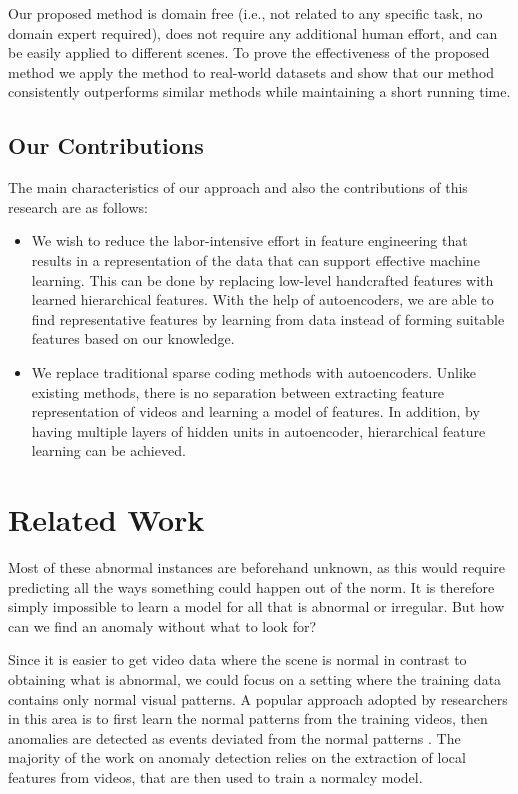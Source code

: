 \documentclass[a4paper]{article}
\begin{document}
Our proposed method is domain free (i.e., not related to any specific task, no domain expert required), does not require any additional human effort, and can be easily applied to different scenes. To prove the effectiveness of the proposed method we apply the method to real-world datasets and show that our method consistently outperforms similar methods while maintaining a short running time.

\subsection{Our Contributions}
The main characteristics of our approach and also the contributions of this research are as follows:
\begin{itemize}
	\item We wish to reduce the labor-intensive effort in feature engineering that results in a representation of the data that can support effective machine learning. This can be done by replacing low-level handcrafted features with learned hierarchical features. With the help of autoencoders, we are able to find representative features by learning from data instead of forming suitable features based on our knowledge.\\
	\item We replace traditional sparse coding methods with autoencoders. Unlike existing methods, there is no separation between extracting feature representation of videos and learning a model of features. In addition, by having multiple layers of hidden units in autoencoder, hierarchical feature learning can be achieved.
\end{itemize} 

\section{Related Work}

Most of these abnormal instances are beforehand unknown, as this would require predicting all the ways something could happen out of the norm. It is therefore simply impossible to learn a model for all that is abnormal or irregular. But how can we find an anomaly without what to look for? 

Since it is easier to get video data where the scene is normal in contrast to obtaining what is abnormal, we could focus on a setting where the training data contains only normal visual patterns. A popular approach adopted by researchers in this area is to first learn the normal patterns from the training videos, then anomalies are detected as events deviated from the normal patterns \cite{lu2013,cong2011,zhao2011,li2011}. The majority of the work on anomaly detection relies on the extraction of local features from videos, that are then used to train a normalcy model. 
\end{document}
